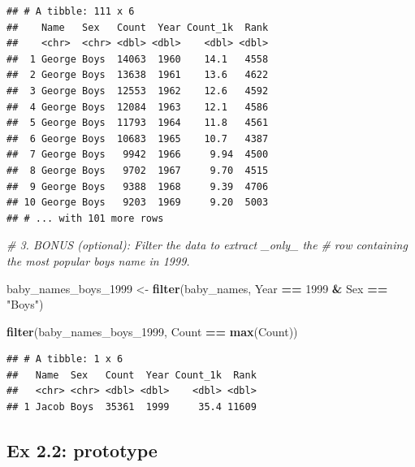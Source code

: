 \documentclass[]{book}
\newenvironment{Shaded}{\begin{snugshade}}{\end{snugshade}}
\newcommand{\CommentTok}[1]{\textcolor[rgb]{0.56,0.35,0.01}{\textit{#1}}}
\newcommand{\DecValTok}[1]{\textcolor[rgb]{0.00,0.00,0.81}{#1}}
\newcommand{\KeywordTok}[1]{\textcolor[rgb]{0.13,0.29,0.53}{\textbf{#1}}}
\newcommand{\NormalTok}[1]{#1}
\newcommand{\OperatorTok}[1]{\textcolor[rgb]{0.81,0.36,0.00}{\textbf{#1}}}
\newcommand{\StringTok}[1]{\textcolor[rgb]{0.31,0.60,0.02}{#1}}
\begin{document}
\begin{verbatim}
## # A tibble: 111 x 6
##    Name   Sex   Count  Year Count_1k  Rank
##    <chr>  <chr> <dbl> <dbl>    <dbl> <dbl>
##  1 George Boys  14063  1960    14.1   4558
##  2 George Boys  13638  1961    13.6   4622
##  3 George Boys  12553  1962    12.6   4592
##  4 George Boys  12084  1963    12.1   4586
##  5 George Boys  11793  1964    11.8   4561
##  6 George Boys  10683  1965    10.7   4387
##  7 George Boys   9942  1966     9.94  4500
##  8 George Boys   9702  1967     9.70  4515
##  9 George Boys   9388  1968     9.39  4706
## 10 George Boys   9203  1969     9.20  5003
## # ... with 101 more rows
\end{verbatim}

\begin{Shaded}
\begin{Highlighting}[]
\CommentTok{# 3.  BONUS (optional): Filter the data to extract _only_ the }
\CommentTok{#     row containing the most popular boys name in 1999.}
\end{Highlighting}
\end{Shaded}

\begin{Shaded}
\begin{Highlighting}[]
\NormalTok{baby_names_boys_}\DecValTok{1999}\NormalTok{ <-}\StringTok{ }\KeywordTok{filter}\NormalTok{(baby_names, }
\NormalTok{                    Year }\OperatorTok{==}\StringTok{ }\DecValTok{1999} \OperatorTok{&}\StringTok{ }\NormalTok{Sex }\OperatorTok{==}\StringTok{ "Boys"}\NormalTok{)}
\end{Highlighting}
\end{Shaded}

\begin{Shaded}
\begin{Highlighting}[]
\KeywordTok{filter}\NormalTok{(baby_names_boys_}\DecValTok{1999}\NormalTok{, Count }\OperatorTok{==}\StringTok{ }\KeywordTok{max}\NormalTok{(Count))}
\end{Highlighting}
\end{Shaded}

\begin{verbatim}
## # A tibble: 1 x 6
##   Name  Sex   Count  Year Count_1k  Rank
##   <chr> <chr> <dbl> <dbl>    <dbl> <dbl>
## 1 Jacob Boys  35361  1999     35.4 11609
\end{verbatim}

\hypertarget{ex-2.2-prototype}{%
\subsection{Ex 2.2: prototype}\label{ex-2.2-prototype}}
\end{document}
